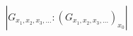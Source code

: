 \documentclass[preview]{standalone}
\begin{document}
\begin{align*}
\left|G_{x_1, x_2, x_3, \dots} : \left(G_{x_1, x_2, x_3, \dots}\right)_{x_0} \right|
\end{align*}
\end{document}
